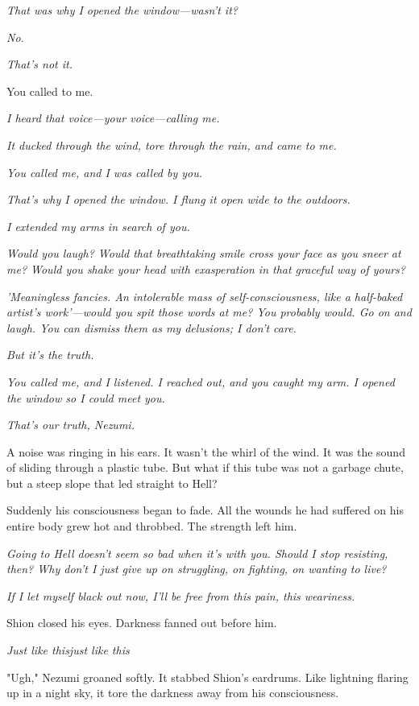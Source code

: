 \emph{That was why I opened the window---wasn't it?}

\emph{No.}

\emph{That's not it.}

You called to me.

\emph{I heard that voice---your voice---calling me.}

\emph{It ducked through the wind, tore through the rain, and came to me.}

\emph{You called me, and I was called by you.}

\emph{That's why I opened the window. I flung it open wide to the outdoors.}

\emph{I extended my arms in search of you.}

\emph{Would you laugh? Would that breathtaking smile cross your face as you
sneer at me? Would you shake your head with exasperation in that
graceful way of yours?}

\emph{'Meaningless fancies. An intolerable mass of self-consciousness, like a
half-baked artist's work'---would you spit those words at me? You probably
would. Go on and laugh. You can dismiss them as my delusions; I don't
care.}

\emph{But it's the truth.}

\emph{You called me, and I listened. I reached out, and you caught my arm. I
opened the window so I could meet you.}

\emph{That's our truth, Nezumi.}

A noise was ringing in his ears. It wasn't the whirl of the wind. It was
the sound of sliding through a plastic tube. But what if this tube was
not a garbage chute, but a steep slope that led straight to Hell?

Suddenly his consciousness began to fade. All the wounds he had suffered
on his entire body grew hot and throbbed. The strength left him.

\emph{Going to Hell doesn't seem so bad when it's with you. Should I stop
resisting, then? Why don't I just give up on struggling, on fighting, on
wanting to live?}

\emph{If I let myself black out now, I'll be free from this pain, this
weariness.}

Shion closed his eyes. Darkness fanned out before him.

\emph{Just like this\el just like this\el }

"Ugh," Nezumi groaned softly. It stabbed Shion's eardrums. Like
lightning flaring up in a night sky, it tore the darkness away from his
consciousness.


